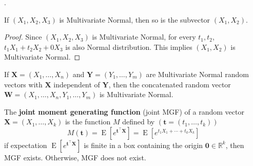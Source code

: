 \documentclass[8pt]{beamer}
\newcommand{\mbb}[1]{\mathbb{#1}}
\newcommand{\mb}[1]{\mathbf{#1}}
\newcommand{\tb}[1]{\textbf{#1}}
\newcommand{\expec}[1]{\operatorname{E}\left[ #1 \right]}
\begin{document}
\begin{frame}{.}
    \begin{theorem}
        If $(X_1,X_2, X_3)$ is Multivariate Normal, then so is the subvector $(X_1, X_2)$.
    \end{theorem}
    \begin{proof}
        Since $(X_1, X_2, X_3)$ is Multivariate Normal, for every $t_1, t_2$, $t_1 X_1 + t_2 X_2 + 0 X_3$ is also Normal distribution. This implies $(X_1, X_2)$ is Multivariate Normal.
    \end{proof}

    \begin{theorem}
        If $\mb{X} = (X_1, \dots, X_n)$ and $\mb{Y} = (Y_1, \dots, Y_m)$ are Multivariate Normal random vectors with $\mb{X}$ independent of $\mb{Y}$, then the concatenated random vector $\mb{W}=(X_1, \dots, X_n, Y_1, \dots, Y_m)$ is Multivariate Normal.
    \end{theorem}
    \begin{definition}
        The \tb{joint moment generating function} (joint MGF) of a random vector $\mb{X} = (X_1, \dots, X_k)$ is the function $M$ defined by $(\mb{t} = (t_1, \dots, t_k))$
        \[
            M(\mb{t}) = \expec{e^{\mb{t}^\top \mb{X}}} = \expec{e^{t_1 X_1 + \cdots + t_k X_k}}
        \]
        if expectation $\expec{e^{\mb{t}^\top \mb{X}}}$ is finite in a box containing the origin $\mb{0} \in \mbb{R}^k$, then MGF exists. Otherwise, MGF does not exist.
    \end{definition}
\end{frame}
\end{document}
